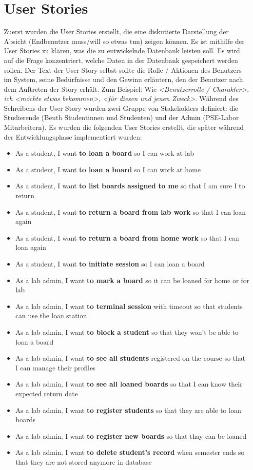 \section{User Stories}
\label{sec:design:user_stories}
Zuerst wurden die User Stories erstellt, die eine diskutierte Darstellung der Absicht (Endbenutzer muss/will so etwas tun) zeigen können. Es ist mithilfe der User Stories zu klären, was die zu entwickelnde Datenbank leisten soll. Es wird auf die Frage konzentriert, welche Daten in der Datenbank gespeichert werden sollen. 
Der Text der User Story selbst sollte die Rolle / Aktionen des Benutzers im System, seine Bedürfnisse und den Gewinn erläutern, den der Benutzer nach dem Auftreten der Story erhält. Zum Beispiel: Wie \textit{<Benutzerrolle / Charakter>, ich <möchte etwas bekommen>, <für diesen und jenen Zweck>}. Während des Schreibens der User Story wurden zwei Gruppe von Stakeholders definiert: die Studierende (Beuth Studentinnen und Studenten) und der Admin (PSE-Labor Mitarbeitern). Es wurden die folgenden User Stories erstellt, die später während der Entwicklungsphase implementiert wurden:
\begin{itemize}
	\itemsep-1.2em 
	\item As a student, I want \textbf{to loan a board} so I can work at lab
	\item As a student, I want \textbf{to loan a board} so I can work at home
	\item As a student, I want \textbf{to list boards assigned to me} so that I am sure I to return
	\item As a student, I want \textbf{to return a board from lab work} so that I can loan again
	\item As a student, I want \textbf{to return a board from home work} so that I can loan again
	\item As a student, I want \textbf{to initiate session} so I can loan a board
	\item As a lab admin, I want \textbf{to mark a board} so it can be loaned for home or for lab
	\item As a lab admin, I want \textbf{to terminal session} with timeout so that students can use the loan station
	\item As a lab admin, I want \textbf{to block a student} so that they won't be able to loan a board
	\item As a lab admin, I want \textbf{to see all students} registered on the course so that I can manage their profiles
	\item As a lab admin, I want \textbf{to see all loaned boards} so that I can know their expected return date
	\item As a lab admin, I want \textbf{to register students} so that they are able to loan boards
	\item As a lab admin, I want \textbf{to register new boards} so that thay can be loaned
	\item As a lab admin, I want \textbf{to delete student's record} when semester ends so that they are not stored anymore in database
\end{itemize}


